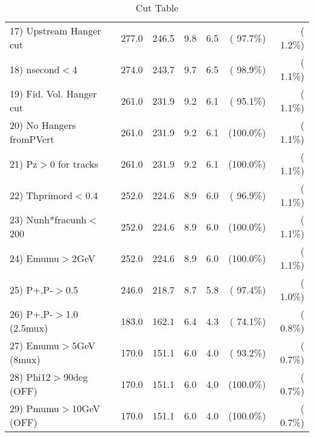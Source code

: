 \begin{table}[h!]
\begin{tabular}{||l||r|r|r|r|r|r||}
 17) Upstream Hanger cut  &        277.0 &        246.5 &          9.8 &          6.5 & ( 97.7\%) & (  1.2\%) \\
 18) nsecond$<$4          &        274.0 &        243.7 &          9.7 &          6.5 & ( 98.9\%) & (  1.1\%) \\
 19) Fid. Vol. Hanger cut &        261.0 &        231.9 &          9.2 &          6.1 & ( 95.1\%) & (  1.1\%) \\
 20) No Hangers fromPVert &        261.0 &        231.9 &          9.2 &          6.1 & (100.0\%) & (  1.1\%) \\
 21) Pz$>$0 for tracks    &        261.0 &        231.9 &          9.2 &          6.1 & (100.0\%) & (  1.1\%) \\
 22) Thprimord$<$0.4      &        252.0 &        224.6 &          8.9 &          6.0 & ( 96.9\%) & (  1.1\%) \\
 23) Nunh*fracunh$<$200   &        252.0 &        224.6 &          8.9 &          6.0 & (100.0\%) & (  1.1\%) \\
 24) Emumu$>$2GeV         &        252.0 &        224.6 &          8.9 &          6.0 & (100.0\%) & (  1.1\%) \\
 25) P+,P-$>$0.5          &        246.0 &        218.7 &          8.7 &          5.8 & ( 97.4\%) & (  1.0\%) \\
 26) P+,P-$>$1.0 (2.5mux) &        183.0 &        162.1 &          6.4 &          4.3 & ( 74.1\%) & (  0.8\%) \\
 27) Emumu$>$5GeV  (8mux) &        170.0 &        151.1 &          6.0 &          4.0 & ( 93.2\%) & (  0.7\%) \\
 28) Phi12$>$90deg  (OFF) &        170.0 &        151.1 &          6.0 &          4.0 & (100.0\%) & (  0.7\%) \\
 29) Pmumu$>$10GeV  (OFF) &        170.0 &        151.1 &          6.0 &          4.0 & (100.0\%) & (  0.7\%) \\
 \hline
 \hline
 \end{tabular}
 \caption{Cut Table           }
 \label{tab-cutcohjpsi-mumu_cohrho0}
 \end{table}
